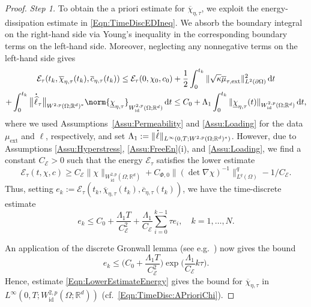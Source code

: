\documentclass[a4paper,12pt]{article}
\newcommand{\ext}{\mathrm{ext}}
\newcommand{\R}{\mathbb{R}}
\newcommand{\ubar}{\underline}
\newcommand{\dt}{\mathrm{\,d}t}
\newcommand{\id}{\mathrm{id}}
\newcommand{\chibar}{\overline{\chi}}
\newcommand{\mubar}{\overline{\mu}}
\newcommand{\cbar}{\overline{c}}
\newcommand\DT[1]{\mathchoice
                 {{\buildrel{\hspace*{.1em}\text{\LARGE.}}\over{#1}}}
                 {{\buildrel{\hspace*{.1em}\text{\Large.}}\over{#1}}}
                 {{\buildrel{\hspace*{.1em}\text{\large.}}\over{#1}}}
                 {{\buildrel{\hspace*{.1em}\text{\large.}}\over{#1}}}}
\renewcommand{\dot}{\DT}
\newcommand{\calE}{\mathcal{E}}
\theoremstyle{plain}
\theoremstyle{definition}
\numberwithin{equation}{section}
\begin{document}
	
\begin{proof} 
\emph{Step 1.} To obtain the a priori estimate for
$\chibar_{\eta,\tau}$, we exploit the energy-dissipation estimate in \eqref{Eqn:TimeDiscEDIneq}. We absorb the boundary integral on the right-hand side via Young's inequality in the corresponding boundary terms on the left-hand side. Moreover, neglecting any nonnegative terms on the left-hand side gives
\begin{multline}
    \calE_\tau(t_k,\chibar_{\eta,\tau}(t_k), \cbar_{\eta,\tau}(t_k))
    \leq \calE_\tau(0,\chi_0,c_0) + \frac{1}{2}\int_0^{t_k} 
\|\sqrt{\kappa}\mubar_{\tau,\ext}\|^2_{L^2(\partial\Omega)}\dt \\
+ \int_0^{t_k} \big\|\dot {\widehat{\ell}}_\tau\big\|_{W^{2,p}(\Omega;\R^d)^*}
    \norm{\ubar\chi_{\eta,\tau}}_{W^{2,p}_\id(\Omega;\R^d)}\dt
    \leq C_0 + \Lambda_1\int_0^{t_k}\|\ubar\chi_{\eta,\tau}(t)\|_{W^{2,p}_\id(\Omega;\R^d)}\dt,
\end{multline}
where we used Assumptions~\ref{Assu:Permeability} and \ref{Assu:Loading} for the data $\mu_\ext$ and $\ell$, respectively, and set $\Lambda_1:=\|\dot\ell\|_{L^\infty(0,T;W^{2,p}(\Omega;\R^d)^*)}$. However, due to Assumptions \ref{Assu:Hyperstress}, \ref{Assu:FreeEn}(i), and \ref{Assu:Loading}, we find a constant $C_\calE>0$ such that the energy $\calE_\tau$ satisfies the lower estimate
\begin{equation}\label{Eqn:LowerEstimateEnergy}
\calE_\tau(t,\chi,c)\geq C_\calE\|\chi\|_{W^{2,p}_\id(\Omega;\R^d)} + C_{\Phi,0}\|(\det\nabla\chi)^{-1}\|_{L^q(\Omega)}^q-1/C_\calE.
\end{equation}
Thus, setting $e_k:=\calE_\tau(t_k,\chibar_{\eta,\tau}(t_k),\cbar_{\eta,\tau}(t_k))$, we have the time-discrete estimate 
\[
e_k \leq C_0+ \frac{\Lambda_1 T}{C^2_\calE} + \frac{\Lambda_1}{C_\calE}\sum_{i=0}^{k-1}  \tau e_i,\quad k =1,\ldots,N.
\]

An application of the discrete Gronwall lemma (see e.g.~\cite[Lemma 1.4.2]{QuaVal1994NAPD}) now gives the bound 
\begin{equation}\label{Eqn:GrownwallTimeDiscrete}
e_k \leq \big(C_0+\frac{\Lambda_1 T}{C_\calE^2}\big)\exp\Big(\frac{\Lambda_1}{C_\calE}k\tau\Big).
\end{equation}
Hence, estimate \eqref{Eqn:LowerEstimateEnergy} gives the bound for 
$\chibar_{\eta,\tau}$ in $L^\infty(0,T;W^{2,p}_\id(\Omega;\R^d))$ (cf.~\eqref{Eqn:TimeDisc:APrioriChi}).


\end{proof}
\end{document}
